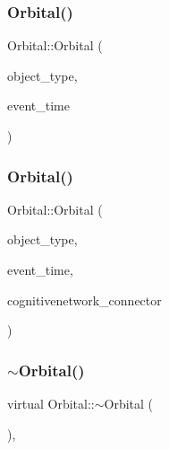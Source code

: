 \mbox{\label{classOrbital_a099b2f1d77a36181fdf1820a6089a05b}} 
\subsubsection{\texorpdfstring{Orbital()}{Orbital()}\hspace{0.1cm}{\footnotesize\ttfamily [3/4]}}
{\footnotesize\ttfamily Orbital\+::\+Orbital (\begin{DoxyParamCaption}\item[{unsigned int}]{object\+\_\+type,  }\item[{std\+::chrono\+::time\+\_\+point$<$ \mbox{\hyperlink{universe_8h_a0ef8d951d1ca5ab3cfaf7ab4c7a6fd80}{Clock}} $>$}]{event\+\_\+time }\end{DoxyParamCaption})\hspace{0.3cm}{\ttfamily [inline]}}

\mbox{\label{classOrbital_ac54161437f3bd23cc1e6e85e702239c8}} 
\subsubsection{\texorpdfstring{Orbital()}{Orbital()}\hspace{0.1cm}{\footnotesize\ttfamily [4/4]}}
{\footnotesize\ttfamily Orbital\+::\+Orbital (\begin{DoxyParamCaption}\item[{unsigned int}]{object\+\_\+type,  }\item[{std\+::chrono\+::time\+\_\+point$<$ \mbox{\hyperlink{universe_8h_a0ef8d951d1ca5ab3cfaf7ab4c7a6fd80}{Clock}} $>$}]{event\+\_\+time,  }\item[{\mbox{\hyperlink{classCognitiveNetwork}{Cognitive\+Network}} \&}]{cognitivenetwork\+\_\+connector }\end{DoxyParamCaption})\hspace{0.3cm}{\ttfamily [inline]}}

\mbox{\label{classOrbital_af3c531d6dd6f3951dca836a2a9787c2c}} 
\subsubsection{\texorpdfstring{$\sim$\+Orbital()}{~Orbital()}}
{\footnotesize\ttfamily virtual Orbital\+::$\sim$\+Orbital (\begin{DoxyParamCaption}{ }\end{DoxyParamCaption})\hspace{0.3cm}{\ttfamily [inline]}, {\ttfamily [virtual]}}



